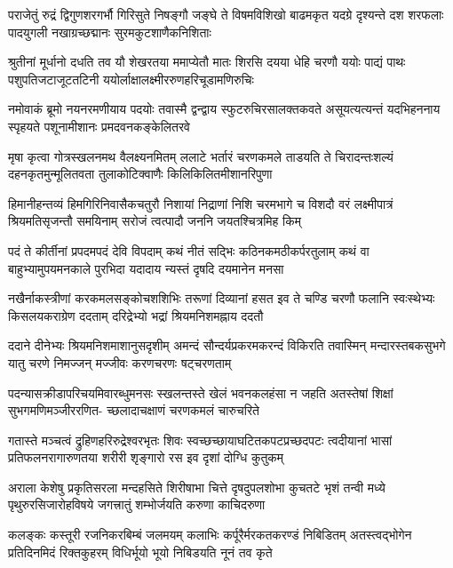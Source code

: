\fourlineindentedshloka
{पराजेतुं रुद्रं द्विगुणशरगर्भौ गिरिसुते}
{निषङ्गौ जङ्घे ते विषमविशिखो बाढमकृत}
{यदग्रे दृश्यन्ते दश शरफलाः पादयुगली}
{नखाग्रच्छद्मानः सुरमकुटशाणैकनिशिताः}%

\fourlineindentedshloka
{श्रुतीनां मूर्धानो दधति तव यौ शेखरतया}
{ममाप्येतौ मातः शिरसि दयया धेहि चरणौ}
{ययोः पाद्यं पाथः पशुपतिजटाजूटतटिनी}
{ययोर्लाक्षालक्ष्मीररुणहरिचूडामणिरुचिः}%

\fourlineindentedshloka
{नमोवाकं ब्रूमो नयनरमणीयाय पदयोः}
{तवास्मै द्वन्द्वाय स्फुटरुचिरसालक्तकवते}
{असूयत्यत्यन्तं यदभिहननाय स्पृहयते}
{पशूनामीशानः प्रमदवनकङ्केलितरवे}%

\fourlineindentedshloka
{मृषा कृत्वा गोत्रस्खलनमथ वैलक्ष्यनमितम्}
{ललाटे भर्तारं चरणकमले ताडयति ते}
{चिरादन्तःशल्यं दहनकृतमुन्मूलितवता}
{तुलाकोटिक्वाणैः किलिकिलितमीशानरिपुणा}%

\fourlineindentedshloka
{हिमानीहन्तव्यं हिमगिरिनिवासैकचतुरौ}
{निशायां निद्राणां निशि चरमभागे च विशदौ}
{वरं लक्ष्मीपात्रं श्रियमतिसृजन्तौ समयिनाम्}
{सरोजं त्वत्पादौ जननि जयतश्चित्रमिह किम्}%

\fourlineindentedshloka
{पदं ते कीर्तीनां प्रपदमपदं देवि विपदाम्}
{कथं नीतं सद्भिः कठिनकमठीकर्परतुलाम्}
{कथं वा बाहुभ्यामुपयमनकाले पुरभिदा}
{यदादाय न्यस्तं दृषदि दयमानेन मनसा}%

\fourlineindentedshloka
{नखैर्नाकस्त्रीणां करकमलसङ्कोचशशिभिः}
{तरूणां दिव्यानां हसत इव ते चण्डि चरणौ}
{फलानि स्वःस्थेभ्यः किसलयकराग्रेण ददताम्}
{दरिद्रेभ्यो भद्रां श्रियमनिशमह्नाय ददतौ}%

\fourlineindentedshloka
{ददाने दीनेभ्यः श्रियमनिशमाशानुसदृशीम्}
{अमन्दं सौन्दर्यप्रकरमकरन्दं विकिरति}
{तवास्मिन् मन्दारस्तबकसुभगे यातु चरणे}
{निमज्जन् मज्जीवः करणचरणः षट्चरणताम्}%

\fourlineindentedshloka
{पदन्यासक्रीडापरिचयमिवारब्धुमनसः}
{स्खलन्तस्ते खेलं भवनकलहंसा न जहति}
{अतस्तेषां शिक्षां सुभगमणिमञ्जीररणित-}
{च्छलादाचक्षाणं चरणकमलं चारुचरिते}%

\fourlineindentedshloka
{गतास्ते मञ्चत्वं द्रुहिणहरिरुद्रेश्वरभृतः}
{शिवः स्वच्छच्छायाघटितकपटप्रच्छदपटः}
{त्वदीयानां भासां प्रतिफलनरागारुणतया}
{शरीरी शृङ्गारो रस इव दृशां दोग्धि कुतुकम्}%

\fourlineindentedshloka
{अराला केशेषु प्रकृतिसरला मन्दहसिते}
{शिरीषाभा चित्ते दृषदुपलशोभा कुचतटे}
{भृशं तन्वी मध्ये पृथुरुरसिजारोहविषये}
{जगत्त्रातुं शम्भोर्जयति करुणा काचिदरुणा}%

\fourlineindentedshloka
{कलङ्कः कस्तूरी रजनिकरबिम्बं जलमयम्}
{कलाभिः कर्पूरैर्मरकतकरण्डं निबिडितम्}
{अतस्त्वद्भोगेन प्रतिदिनमिदं रिक्तकुहरम्}
{विधिर्भूयो भूयो निबिडयति नूनं तव कृते}%

